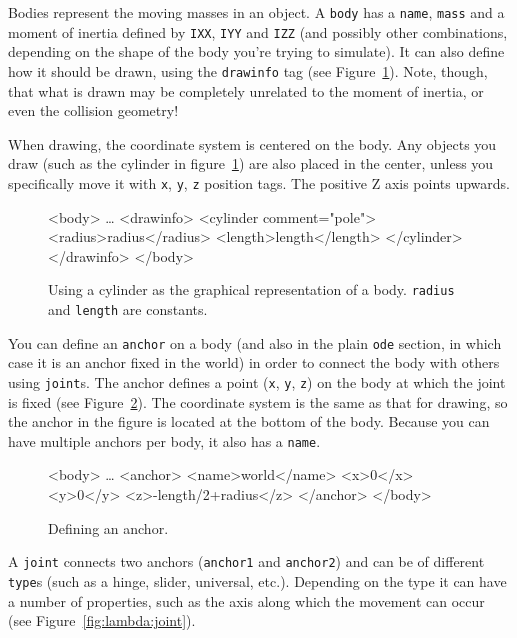 \documentclass{article}
\newcommand{\txt}[1]{\texttt{#1}}
\newcommand{\tab}{\hspace{3em}}
\newcommand{\xt}[1]{\textcolor{matlab-keyword}{<#1>}}
\newcommand{\xa}[1]{\textcolor{matlab-string}{#1}}
\newcommand{\xs}[1]{\textcolor{matlab-string}{"#1"}}
\renewcommand{\xi}[1]{\textcolor{xml-constant}{#1}}
\newenvironment{code}{\alltt\small}{\endalltt}
\newenvironment{boxedcode}{\begin{boxedminipage}{\linewidth}\begin{code}}{\end{code}\end{boxedminipage}}
\begin{document}
Bodies represent the moving masses in an object. A \txt{body} has a \txt{name}, \txt{mass} and a moment of inertia defined by \txt{IXX}, \txt{IYY} and \txt{IZZ} (and possibly other combinations, depending on the shape of the body you're trying to simulate). It can also define how it should be drawn, using the \txt{drawinfo} tag (see Figure~\ref{fig:lambda:drawinfo}). Note, though, that what is drawn may be completely unrelated to the moment of inertia, or even the collision geometry!

When drawing, the coordinate system is centered on the body. Any objects you draw (such as the cylinder in figure~\ref{fig:lambda:drawinfo}) are also placed in the center, unless you specifically move it with \txt{x}, \txt{y}, \txt{z} position tags. The positive Z axis points upwards.

\begin{figure}[h!]
\begin{boxedcode}
\xt{body}
\tab\ldots
\tab\xt{drawinfo}
\tab\tab\xt{cylinder \xa{comment=}\xs{pole}}
\tab\tab\tab\xt{radius}\xi{radius}\xt{/radius}
\tab\tab\tab\xt{length}\xi{length}\xt{/length}
\tab\tab\xt{/cylinder}
\tab\xt{/drawinfo}
\xt{/body}
\end{boxedcode}
\caption{Using a cylinder as the graphical representation of a body. \txt{\xi{radius}} and \txt{\xi{length}} are constants.}
\label{fig:lambda:drawinfo}
\end{figure} 

You can define an \txt{anchor} on a body (and also in the plain \txt{ode} section, in which case it is an anchor fixed in the world) in order to connect the body with others using \txt{joint}s. The anchor defines a point (\txt{x}, \txt{y}, \txt{z}) on the body at which the joint is fixed (see Figure~\ref{fig:lambda:anchor}). The coordinate system is the same as that for drawing, so the anchor in the figure is located at the bottom of the body. Because you can have multiple anchors per body, it also has a \txt{name}.

\begin{figure}[h!]
\begin{boxedcode}
\xt{body}
\tab\ldots
\tab\xt{anchor}
\tab\tab\xt{name}world\xt{/name}
\tab\tab\xt{x}0\xt{/x}
\tab\tab\xt{y}0\xt{/y}
\tab\tab\xt{z}-\xi{length}/2+\xi{radius}\xt{/z}
\tab\xt{/anchor}
\xt{/body}
\end{boxedcode}
\caption{Defining an anchor.}
\label{fig:lambda:anchor}
\end{figure} 

A \txt{joint} connects two anchors (\txt{anchor1} and \txt{anchor2}) and can be of different \txt{type}s (such as a hinge, slider, universal, etc.). Depending on the type it can have a number of properties, such as the axis along which the movement can occur (see Figure~\ref{fig:lambda:joint}).
\end{document}
